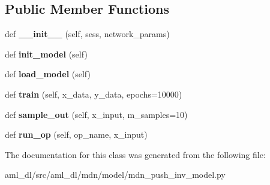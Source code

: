 \subsection*{Public Member Functions}
\begin{DoxyCompactItemize}
\item 
\hypertarget{classsrc_1_1aml__dl_1_1mdn_1_1model_1_1mdn__push__inv__model_1_1_m_d_n_push_inverse_model_a3857d23d6d7b09814cbbef93a9b9940c}{}\label{classsrc_1_1aml__dl_1_1mdn_1_1model_1_1mdn__push__inv__model_1_1_m_d_n_push_inverse_model_a3857d23d6d7b09814cbbef93a9b9940c} 
def {\bfseries \+\_\+\+\_\+init\+\_\+\+\_\+} (self, sess, network\+\_\+params)
\item 
\hypertarget{classsrc_1_1aml__dl_1_1mdn_1_1model_1_1mdn__push__inv__model_1_1_m_d_n_push_inverse_model_a7aff8166ce747a753f7fdc368acc3c37}{}\label{classsrc_1_1aml__dl_1_1mdn_1_1model_1_1mdn__push__inv__model_1_1_m_d_n_push_inverse_model_a7aff8166ce747a753f7fdc368acc3c37} 
def {\bfseries init\+\_\+model} (self)
\item 
\hypertarget{classsrc_1_1aml__dl_1_1mdn_1_1model_1_1mdn__push__inv__model_1_1_m_d_n_push_inverse_model_a1a95d39e8ef22f6c7930cab122ce0458}{}\label{classsrc_1_1aml__dl_1_1mdn_1_1model_1_1mdn__push__inv__model_1_1_m_d_n_push_inverse_model_a1a95d39e8ef22f6c7930cab122ce0458} 
def {\bfseries load\+\_\+model} (self)
\item 
\hypertarget{classsrc_1_1aml__dl_1_1mdn_1_1model_1_1mdn__push__inv__model_1_1_m_d_n_push_inverse_model_a158fa7524422abb2dde67957cb191680}{}\label{classsrc_1_1aml__dl_1_1mdn_1_1model_1_1mdn__push__inv__model_1_1_m_d_n_push_inverse_model_a158fa7524422abb2dde67957cb191680} 
def {\bfseries train} (self, x\+\_\+data, y\+\_\+data, epochs=10000)
\item 
\hypertarget{classsrc_1_1aml__dl_1_1mdn_1_1model_1_1mdn__push__inv__model_1_1_m_d_n_push_inverse_model_a714739d5cb44238925e462dd2f20017a}{}\label{classsrc_1_1aml__dl_1_1mdn_1_1model_1_1mdn__push__inv__model_1_1_m_d_n_push_inverse_model_a714739d5cb44238925e462dd2f20017a} 
def {\bfseries sample\+\_\+out} (self, x\+\_\+input, m\+\_\+samples=10)
\item 
\hypertarget{classsrc_1_1aml__dl_1_1mdn_1_1model_1_1mdn__push__inv__model_1_1_m_d_n_push_inverse_model_a9ff89e2b0ea4275235cb7fd467dc2ab4}{}\label{classsrc_1_1aml__dl_1_1mdn_1_1model_1_1mdn__push__inv__model_1_1_m_d_n_push_inverse_model_a9ff89e2b0ea4275235cb7fd467dc2ab4} 
def {\bfseries run\+\_\+op} (self, op\+\_\+name, x\+\_\+input)
\end{DoxyCompactItemize}


The documentation for this class was generated from the following file\+:\begin{DoxyCompactItemize}
\item 
aml\+\_\+dl/src/aml\+\_\+dl/mdn/model/mdn\+\_\+push\+\_\+inv\+\_\+model.\+py\end{DoxyCompactItemize}
